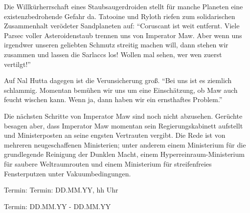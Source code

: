 \documentclass[final]{multiversum}
\begin{document}
Die Willkürherrschaft eines Staubsaugerdroiden stellt für manche Planeten eine existenzbedrohende Gefahr da. 
Tatooine und Ryloth riefen zum solidarischen Zusammenhalt verödeter Sandplaneten auf: 
\enquote{Coruscant ist weit entfernt. 
Viele Parsec voller Asteroidenstaub trennen uns von Imperator Maw. 
Aber wenn uns irgendwer unseren geliebten Schmutz streitig machen will, dann stehen wir zusammen und lassen die Sarlaccs los! 
Wollen mal sehen, wer wen zuerst vertilgt!}

Auf Nal Hutta dagegen ist die Verunsicherung groß. 
\enquote{Bei uns ist es ziemlich schlammig. 
Momentan bemühen wir uns um eine Einschätzung, ob Maw auch feucht wischen kann. 
Wenn ja, dann haben wir ein ernsthaftes Problem.}

Die nächsten Schritte von Imperator Maw sind noch nicht abzusehen. 
Gerüchte besagen aber, dass Imperator Maw momentan sein Regierungskabinett aufstellt und Ministerposten an seine engsten Vertrauten vergibt. 
Die Rede ist von mehreren neugeschaffenen Ministerien; unter anderem einem Ministerium für die grundlegende Reinigung der Dunklen Macht, einem Hyperreinraum-Ministerium für saubere Weltraumrouten und einem Ministerium für streifenfreies Fensterputzen unter Vakuumbedingungen.



\begin{termine}
\item Termin: Termin: DD.MM.YY, hh Uhr
  \item Termin: DD.MM.YY - DD.MM.YY
\end{termine}
\impressum
\end{document}
